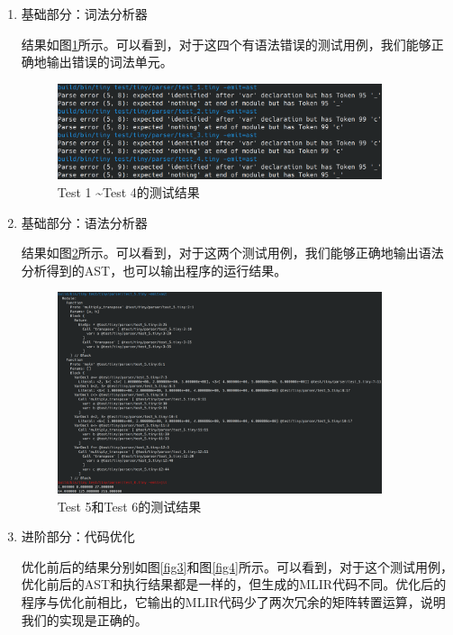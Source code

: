 \documentclass[lang=cn,11pt,a4paper]{elegantpaper}
\begin{document}
\begin{enumerate}
  \item 基础部分：词法分析器

  结果如图\ref{fig1}所示。可以看到，对于这四个有语法错误的测试用例，我们能够正确地输出错误的词法单元。
  \begin{figure}[H]
    \centering
    \includegraphics[width=0.9\textwidth]{./img/test1-4.png}
    \caption{Test 1 \textasciitilde Test 4的测试结果}
    \label{fig1}
  \end{figure}

  \item 基础部分：语法分析器

  结果如图\ref{fig2}所示。可以看到，对于这两个测试用例，我们能够正确地输出语法分析得到的AST，也可以输出程序的运行结果。

  \begin{figure}[H]
    \centering
    \includegraphics[width=0.9\textwidth]{./img/test5-6.png}
    \caption{Test 5和Test 6的测试结果}
    \label{fig2}
  \end{figure}

  \item 进阶部分：代码优化

  优化前后的结果分别如图\ref{fig3}和图\ref{fig4}所示。可以看到，对于这个测试用例，优化前后的AST和执行结果都是一样的，但生成的MLIR代码不同。优化后的程序与优化前相比，它输出的MLIR代码少了两次冗余的矩阵转置运算，说明我们的实现是正确的。


\end{enumerate}
\end{document}
